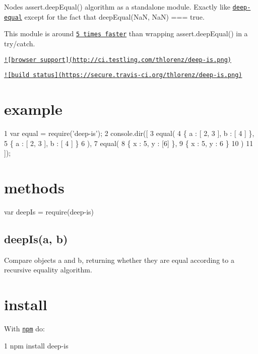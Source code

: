 Node\textquotesingle{}s {\ttfamily assert.\+deep\+Equal() algorithm} as a standalone module. Exactly like \href{https://github.com/substack/node-deep-equal}{\tt deep-\/equal} except for the fact that {\ttfamily deep\+Equal(\+Na\+N, Na\+N) === true}.

This module is around \href{https://gist.github.com/2790507}{\tt 5 times faster} than wrapping {\ttfamily assert.\+deep\+Equal()} in a {\ttfamily try/catch}.

\href{http://ci.testling.com/thlorenz/deep-is}{\tt !\mbox{[}browser support\mbox{]}(http\+://ci.\+testling.\+com/thlorenz/deep-\/is.\+png)}

\href{http://travis-ci.org/thlorenz/deep-is}{\tt !\mbox{[}build status\mbox{]}(https\+://secure.\+travis-\/ci.\+org/thlorenz/deep-\/is.\+png)}

\section*{example }


\begin{DoxyCode}
1 var equal = require('deep-is');
2 console.dir([
3     equal(
4         \{ a : [ 2, 3 ], b : [ 4 ] \},
5         \{ a : [ 2, 3 ], b : [ 4 ] \}
6     ),
7     equal(
8         \{ x : 5, y : [6] \},
9         \{ x : 5, y : 6 \}
10     )
11 ]);
\end{DoxyCode}


\section*{methods }

var deep\+Is = require(\textquotesingle{}deep-\/is\textquotesingle{})

\subsection*{deep\+Is(a, b) }

Compare objects {\ttfamily a} and {\ttfamily b}, returning whether they are equal according to a recursive equality algorithm.

\section*{install }

With \href{http://npmjs.org}{\tt npm} do\+:


\begin{DoxyCode}
1 npm install deep-is
\end{DoxyCode}



